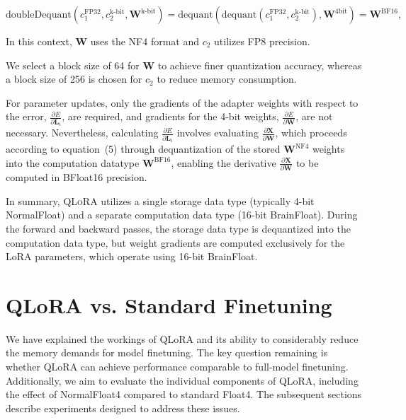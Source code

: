 \begin{equation}
    \text{doubleDequant}(c_1^{\text{FP32}}, c_2^{\text{k-bit}}, \mathbf{W}^{\text{k-bit}}) = \text{dequant}(\text{dequant}(c_1^{\text{FP32}}, c_2^{\text{k-bit}}), \mathbf{W}^{\text{4bit}}) = \mathbf{W}^{\text{BF16}},
\end{equation}

In this context, $\mathbf{W}$ uses the NF4 format and $c_2$ utilizes FP8 precision.

We select a block size of 64 for $\mathbf{W}$ to achieve finer quantization accuracy, whereas a block size of 256 is chosen for $c_2$ to reduce memory consumption.

For parameter updates, only the gradients of the adapter weights with respect to the error, $\frac{\partial E}{\partial \mathbf{L}_i}$, are required, and gradients for the 4-bit weights, $\frac{\partial E}{\partial \mathbf{W}}$, are not necessary. Nevertheless, calculating $\frac{\partial E}{\partial \mathbf{L}_i}$ involves evaluating $\frac{\partial \mathbf{X}}{\partial \mathbf{W}}$, which proceeds according to equation~(5) through dequantization of the stored $\mathbf{W}^{\text{NF4}}$ weights into the computation datatype $\mathbf{W}^{\text{BF16}}$, enabling the derivative $\frac{\partial \mathbf{X}}{\partial \mathbf{W}}$ to be computed in BFloat16 precision.

In summary, \textsc{QLoRA} utilizes a single storage data type (typically 4-bit NormalFloat) and a separate computation data type (16-bit BrainFloat). During the forward and backward passes, the storage data type is dequantized into the computation data type, but weight gradients are computed exclusively for the LoRA parameters, which operate using 16-bit BrainFloat.

\section{QLoRA vs. Standard Finetuning}
\label{sec:comp_to_std}

We have explained the workings of QLoRA and its ability to considerably reduce the memory demands for model finetuning. The key question remaining is whether QLoRA can achieve performance comparable to full-model finetuning. Additionally, we aim to evaluate the individual components of QLoRA, including the effect of NormalFloat4 compared to standard Float4. The subsequent sections describe experiments designed to address these issues.

